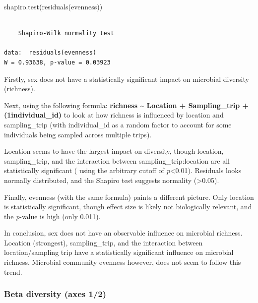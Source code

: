 \documentclass[
  letterpaper,
  DIV=11,
  numbers=noendperiod]{scrartcl}
\newenvironment{Shaded}{\begin{snugshade}}{\end{snugshade}}
\newcommand{\FunctionTok}[1]{\textcolor[rgb]{0.28,0.35,0.67}{#1}}
\newcommand{\NormalTok}[1]{\textcolor[rgb]{0.00,0.23,0.31}{#1}}
\begin{document}
\begin{Shaded}
\begin{Highlighting}[]
\FunctionTok{shapiro.test}\NormalTok{(}\FunctionTok{residuals}\NormalTok{(evenness))}
\end{Highlighting}
\end{Shaded}

\begin{verbatim}

    Shapiro-Wilk normality test

data:  residuals(evenness)
W = 0.93638, p-value = 0.03923
\end{verbatim}

Firstly, sex does not have a statistically significant impact on
microbial diversity (richness).

Next, using the following formula: \textbf{richness \textasciitilde{}
Location + Sampling\_trip + (1\textbar individual\_id)} to look at how
richness is influenced by location and sampling\_trip (with
individual\_id as a random factor to account for some individuals being
sampled across multiple trips).

Location seems to have the largest impact on diversity, though location,
sampling\_trip, and the interaction between sampling\_trip:location are
all statistically significant ( using the arbitrary cutoff of
\emph{p}\textless0.01). Residuals looks normally distributed, and the
Shapiro test suggests normality (\textgreater0.05).

Finally, evenness (with the same formula) paints a different picture.
Only location is statistically significant, though effect size is likely
not biologically relevant, and the \emph{p}-value is high (only 0.011).

In conclusion, sex does not have an observable influence on microbial
richness. Location (strongest), sampling\_trip, and the interaction
between location/sampling trip have a statistically significant
influence on microbial richness. Microbial community evenness however,
does not seem to follow this trend.

\subsubsection{Beta diversity (axes 1/2)}\label{beta-diversity-axes-12}
\end{document}
